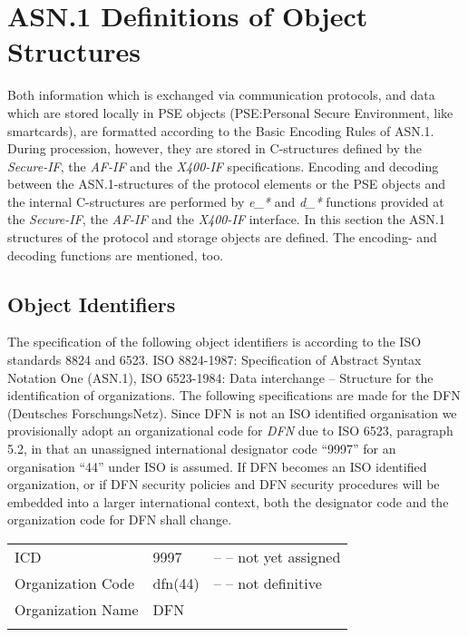 \section{ASN.1 Definitions of Object Structures}
\label{asn1}
\thispagestyle{myheadings}

Both information which is exchanged via communication protocols,
and data which are stored locally in PSE objects 
(PSE:Personal Secure Environment, like smartcards),
are formatted according to the
Basic Encoding Rules of ASN.1.
During procession, however,
they are stored in C-structures
defined by the {\em Secure-IF}, the {\em AF-IF} and the 
{\em X400-IF} specifications.
Encoding and decoding between the ASN.1-structures
of the protocol elements or the PSE objects 
and the internal C-structures
are performed by {\em e\_*} and {\em d\_*} functions
provided at the {\em Secure-IF}, the {\em AF-IF} 
and the {\em X400-IF} interface.
In this section the ASN.1 structures
of the protocol and storage objects are defined.
The encoding- and decoding functions are mentioned, too.

\subsection{Object Identifiers}
\label{asn1-oid}

The specification of the following object identifiers
is according to the ISO standards 8824 and 6523.
ISO 8824-1987: Specification of Abstract Syntax Notation One (ASN.1),
ISO 6523-1984: Data interchange --
Structure for the identification of organizations. The following specifications 
are made for the DFN (Deutsches ForschungsNetz).
Since DFN is not an ISO identified organisation
we provisionally adopt an organizational code for {\em DFN}
due to ISO 6523, paragraph 5.2, in that an unassigned
international designator code ``9997'' for an
organisation ``44'' under ISO is assumed.
If DFN becomes an ISO identified organization, or if 
DFN security policies and DFN security procedures will be
embedded into a larger international context, 
both the designator code and the organization code for DFN
shall change.

{\small
\begin {center}
\begin {tabular}{lll}
ICD & 9997 & -- -- not yet assigned \\
Organization Code & dfn(44) & -- -- not definitive \\
Organization Name & DFN & \\
 & & \\
\end {tabular}
\end {center}
}


